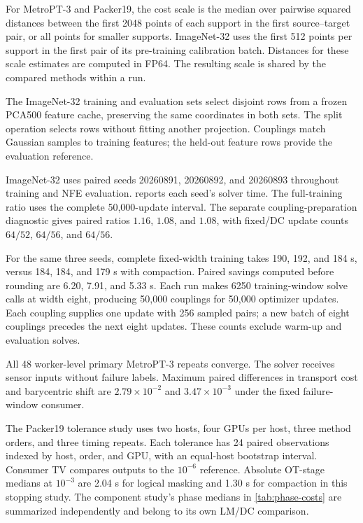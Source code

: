 For MetroPT-3 and Packer19, the cost scale is the median over pairwise squared distances between the first 2048 points of each support in the first source--target pair, or all points for smaller supports. ImageNet-32 uses the first 512 points per support in the first pair of its pre-training calibration batch. Distances for these scale estimates are computed in FP64. The resulting scale is shared by the compared methods within a run.

The ImageNet-32 training and evaluation sets select disjoint rows from a frozen PCA500 feature cache, preserving the same coordinates in both sets. The split operation selects rows without fitting another projection. Couplings match Gaussian samples to training features; the held-out feature rows provide the evaluation reference.

ImageNet-32 uses paired seeds 20260891, 20260892, and 20260893 throughout training and NFE evaluation.  reports each seed's solver time. The full-training ratio uses the complete 50,000-update interval. The separate coupling-preparation diagnostic gives paired ratios $1.16$, $1.08$, and $1.08$, with fixed/DC update counts $64/52$, $64/56$, and $64/56$.



For the same three seeds, complete fixed-width training takes 190, 192, and 184 s, versus 184, 184, and 179 s with compaction. Paired savings computed before rounding are 6.20, 7.91, and 5.33 s. Each run makes 6250 training-window solve calls at width eight, producing 50,000 couplings for 50,000 optimizer updates. Each coupling supplies one update with 256 sampled pairs; a new batch of eight couplings precedes the next eight updates. These counts exclude warm-up and evaluation solves.

All 48 worker-level primary MetroPT-3 repeats converge. The solver receives sensor inputs without failure labels. Maximum paired differences in transport cost and barycentric shift are $2.79\times10^{-2}$ and $3.47\times10^{-3}$ under the fixed failure-window consumer.

The Packer19 tolerance study uses two hosts, four GPUs per host, three method orders, and three timing repeats. Each tolerance has 24 paired observations indexed by host, order, and GPU, with an equal-host bootstrap interval. Consumer TV compares outputs to the $10^{-6}$ reference. Absolute OT-stage medians at $10^{-3}$ are 2.04 s for logical masking and 1.30 s for compaction in this stopping study. The component study's phase medians in \cref{tab:phase-costs} are summarized independently and belong to its own LM/DC comparison.

